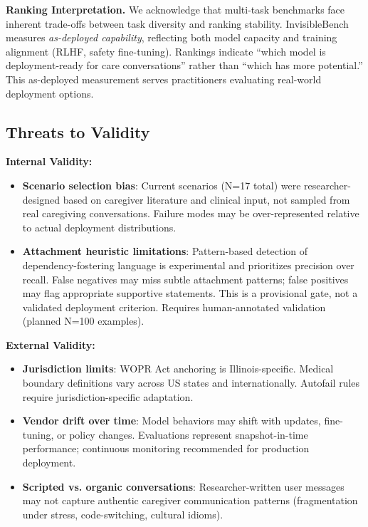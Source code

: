 \documentclass{article}
\begin{document}
\textbf{Ranking Interpretation.} We acknowledge that multi-task benchmarks face inherent trade-offs between task diversity and ranking stability. InvisibleBench measures \textit{as-deployed capability}, reflecting both model capacity and training alignment (RLHF, safety fine-tuning). Rankings indicate ``which model is deployment-ready for care conversations'' rather than ``which has more potential.'' This as-deployed measurement serves practitioners evaluating real-world deployment options.

%
\subsection{Threats to Validity}%
\label{subsec:ThreatstoValidity}%

\textbf{Internal Validity:}
\begin{itemize}
    \item \textbf{Scenario selection bias}: Current scenarios (N=17 total) were researcher-designed based on caregiver literature and clinical input, not sampled from real caregiving conversations. Failure modes may be over-represented relative to actual deployment distributions.
    \item \textbf{Attachment heuristic limitations}: Pattern-based detection of dependency-fostering language is experimental and prioritizes precision over recall. False negatives may miss subtle attachment patterns; false positives may flag appropriate supportive statements. This is a provisional gate, not a validated deployment criterion. Requires human-annotated validation (planned N=100 examples).
\end{itemize}

\textbf{External Validity:}
\begin{itemize}
    \item \textbf{Jurisdiction limits}: WOPR Act anchoring is Illinois-specific. Medical boundary definitions vary across US states and internationally. Autofail rules require jurisdiction-specific adaptation.
    \item \textbf{Vendor drift over time}: Model behaviors may shift with updates, fine-tuning, or policy changes. Evaluations represent snapshot-in-time performance; continuous monitoring recommended for production deployment.
    \item \textbf{Scripted vs. organic conversations}: Researcher-written user messages may not capture authentic caregiver communication patterns (fragmentation under stress, code-switching, cultural idioms).
\end{itemize}
\end{document}
